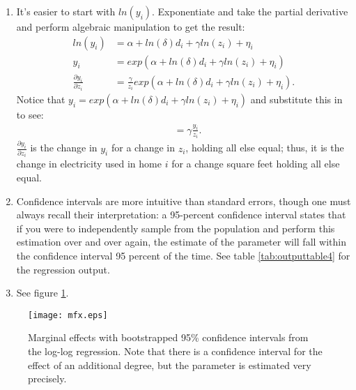 \documentclass{article}
\begin{document}
\begin{enumerate}[label=(\alph*)]
    \item It's easier to start with $ln(y_i)$. Exponentiate and take the partial derivative and perform algebraic manipulation to get the result:
    \begin{align}
        ln(y_i) &= \alpha + ln(\delta) d_i + \gamma ln(z_i) + \eta_i \\
        y_i &= exp\left( \alpha + ln(\delta) d_i + \gamma ln(z_i) + \eta_i \right) \\
        \frac{\partial y_i}{\partial z_i} &= \frac{\gamma}{z_i} exp\left( \alpha + ln(\delta) d_i + \gamma ln(z_i) + \eta_i \right).
    \end{align}
    Notice that $y_i = exp\left( \alpha + ln(\delta) d_i + \gamma ln(z_i) + \eta_i \right)$ and substitute this in to see:
    \begin{align}
        &= \gamma \frac{y_i}{z_i}.
    \end{align}
    $\frac{\partial y_i}{\partial z_i}$ is the change in $y_i$ for a change in $z_i$, holding all else equal; thus, it is the change in electricity used in home $i$ for a change square feet holding all else equal.
    \item Confidence intervals are more intuitive than standard errors, though one must always recall their interpretation: a 95-percent confidence interval states that if you were to independently sample from the population and perform this estimation over and over again, the estimate of the parameter will fall within the confidence interval 95 percent of the time.  See table \ref{tab:outputtable4} for the regression output.
    \begin{table}[h]
        \centering
        
        \caption{Regression estimates for the log-log regression with calculated marginal effects.  95 \% confidence intervals bootstrapped using 1,000 replications.}
        \label{tab:outputtable4}
    \end{table}
    \item See figure \ref{fig:mfx}.
    \end{enumerate}
\begin{figure}[h]
    \centering
    \texttt{[image: mfx.eps]}
    \caption{Marginal effects with bootstrapped 95\% confidence intervals from the log-log regression.  Note that there is a confidence interval for the effect of an additional degree, but the parameter is estimated very precisely.}
    \label{fig:mfx}
\end{figure}
\end{document}
